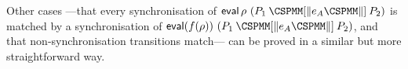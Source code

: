 Other cases ---that every synchronisation of $\eval \rho~ (P_1 \synPar{e_A}
P_2)$ is matched by a synchronisation of $\eval (f(\rho)) ~ (P_1 \synPar{e_A}
P_2)$, and that non-synchronisation transitions match--- can be proved in a
similar but more straightforward way.




